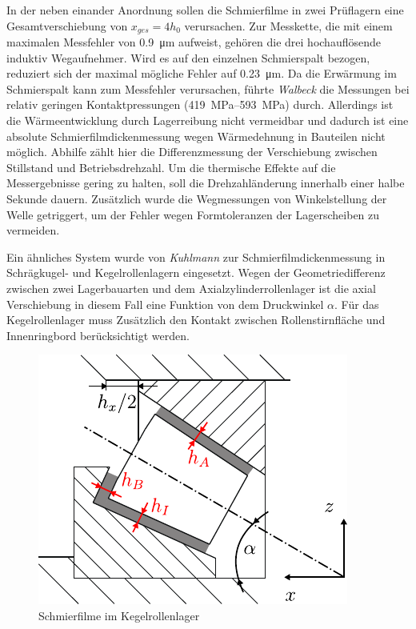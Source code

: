 In der neben einander Anordnung sollen die Schmierfilme in zwei Prüflagern eine Gesamtverschiebung von $x_{ges} = 4  h_0$ verursachen.
Zur Messkette, die mit einem maximalen Messfehler von \SI{0,9}{\micro\meter} aufweist, gehören die drei hochauflösende induktiv Wegaufnehmer.
Wird es auf den einzelnen Schmierspalt bezogen, reduziert sich der maximal mögliche Fehler auf \SI{0,23}{\micro\meter}.
Da die Erwärmung im Schmierspalt kann zum Messfehler verursachen, führte \textit{Walbeck} die Messungen bei relativ geringen Kontaktpressungen (\SIrange{419}{593}{\mega\pascal}) durch.
Allerdings ist die Wärmeentwicklung durch Lagerreibung nicht vermeidbar und dadurch ist eine absolute Schmierfilmdickenmessung wegen Wärmedehnung in Bauteilen nicht möglich.
Abhilfe zählt hier die Differenzmessung der Verschiebung zwischen Stillstand und Betriebsdrehzahl.
Um die thermische Effekte auf die Messergebnisse gering zu halten, soll die Drehzahländerung innerhalb einer halbe Sekunde dauern.
Zusätzlich wurde die Wegmessungen von Winkelstellung der Welle getriggert, um der Fehler wegen Formtoleranzen der Lagerscheiben zu vermeiden.

Ein ähnliches System wurde von \textit{Kuhlmann} \cite{kuhlmann_2009} zur Schmierfilmdickenmessung in Schrägkugel- und Kegelrollenlagern eingesetzt.
Wegen der Geometriedifferenz zwischen zwei Lagerbauarten und dem Axialzylinderrollenlager ist die axial Verschiebung in diesem Fall eine Funktion von dem Druckwinkel $\alpha$.
Für das Kegelrollenlager muss Zusätzlich den Kontakt zwischen Rollenstirnfläche und Innenringbord berücksichtigt werden.
\begin{figure}[htb]
    \centering
    \includegraphics[]{./images/kerola_kuhlmann.pdf}
    \caption{Schmierfilme im Kegelrollenlager \cite{kuhlmann_2009}}
    \label{fig:kerola_kuhlmann}
\end{figure}
%

